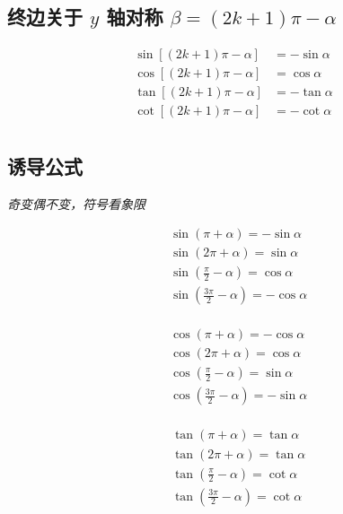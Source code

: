 \documentclass[a4paper, fleqn, fontset = mac]{ctexart}
\newcommand{\diform}{\noindent}
\begin{document}
\begin{multicols}{2}
		\subsection{终边关于 $ y $ 轴对称 $\beta=(2k+1)\pi-\alpha$}\diform
			\begin{align*}
			\sin\left[\left(2k+1\right)\pi-\alpha\right]&=-\sin\alpha \\
			\cos\left[\left(2k+1\right)\pi-\alpha\right]&=\cos\alpha \\
			\tan\left[\left(2k+1\right)\pi-\alpha\right]&=-\tan\alpha \\
			\cot\left[\left(2k+1\right)\pi-\alpha\right]&=-\cot\alpha \\
			\end{align*}
		\subsection{诱导公式}
		\textit{奇变偶不变，符号看象限}
		
		\begin{multicols}{2}[\setlength{\columnseprule}{0pt}\setlength{\columnseprule}{0pt}]
			\begin{align*}
			& \sin\left( \pi + \alpha \right) = -\sin\alpha \\
			& \sin\left( 2\pi + \alpha \right) = \sin\alpha \\
			& \sin\left( \frac\pi2 - \alpha \right) = \cos\alpha \\
			& \sin\left( \frac{3\pi}2 - \alpha \right) = -\cos\alpha \\
			\end{align*}
				
			\begin{align*}
			& \cos\left( \pi + \alpha \right) = -\cos\alpha \\
			& \cos\left( 2\pi + \alpha \right) = \cos\alpha \\
			& \cos\left( \frac\pi2 - \alpha \right) = \sin\alpha \\
			& \cos\left( \frac{3\pi}2 - \alpha \right) = -\sin\alpha \\
			\end{align*}
			
			\begin{align*}
			& \tan\left( \pi + \alpha \right) = \tan\alpha \\
			& \tan\left( 2\pi + \alpha \right) = \tan\alpha \\
			& \tan\left( \frac\pi2 - \alpha \right) = \cot\alpha \\
			& \tan\left( \frac{3\pi}2 - \alpha \right) = \cot\alpha \\
			\end{align*}
			

\end{multicols}
\end{multicols}
\end{document}
